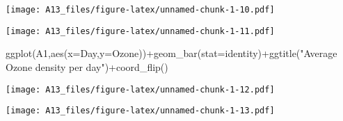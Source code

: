 \documentclass[
]{article}
\newenvironment{Shaded}{\begin{snugshade}}{\end{snugshade}}
\newcommand{\AttributeTok}[1]{\textcolor[rgb]{0.77,0.63,0.00}{#1}}
\newcommand{\DecValTok}[1]{\textcolor[rgb]{0.00,0.00,0.81}{#1}}
\newcommand{\FunctionTok}[1]{\textcolor[rgb]{0.00,0.00,0.00}{#1}}
\newcommand{\NormalTok}[1]{#1}
\newcommand{\OtherTok}[1]{\textcolor[rgb]{0.56,0.35,0.01}{#1}}
\newcommand{\SpecialCharTok}[1]{\textcolor[rgb]{0.00,0.00,0.00}{#1}}
\newcommand{\StringTok}[1]{\textcolor[rgb]{0.31,0.60,0.02}{#1}}
\begin{document}
\texttt{[image: A13\_files/figure-latex/unnamed-chunk-1-10.pdf]}

\begin{Shaded}
\end{Shaded}

\texttt{[image: A13\_files/figure-latex/unnamed-chunk-1-11.pdf]}

\begin{Shaded}
\begin{Highlighting}[]
\FunctionTok{ggplot}\NormalTok{(A1,}\FunctionTok{aes}\NormalTok{(}\AttributeTok{x=}\NormalTok{Day,}\AttributeTok{y=}\NormalTok{Ozone))}\SpecialCharTok{+}\FunctionTok{geom\_bar}\NormalTok{(}\AttributeTok{stat=}\StringTok{\textquotesingle{}identity\textquotesingle{}}\NormalTok{)}\SpecialCharTok{+}\FunctionTok{ggtitle}\NormalTok{(}\StringTok{"Average Ozone density per day"}\NormalTok{)}\SpecialCharTok{+}\FunctionTok{coord\_flip}\NormalTok{()}
\end{Highlighting}
\end{Shaded}

\texttt{[image: A13\_files/figure-latex/unnamed-chunk-1-12.pdf]}

\begin{Shaded}
\end{Shaded}

\texttt{[image: A13\_files/figure-latex/unnamed-chunk-1-13.pdf]}

\begin{Shaded}
\end{Shaded}
\end{document}
